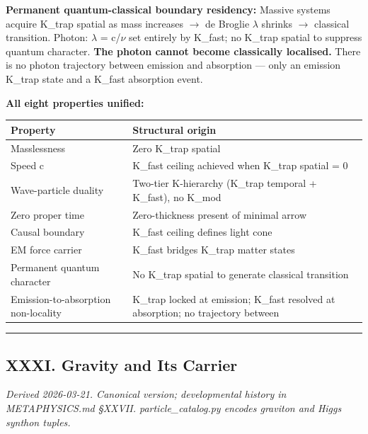 \documentclass[12pt,a4paper]{article}
\begin{document}
\textbf{Permanent quantum-classical boundary residency:} Massive systems acquire K\_trap spatial as mass increases $\rightarrow$ de Broglie $\lambda$ shrinks $\rightarrow$ classical transition. Photon: $\lambda$ = c/$\nu$ set entirely by K\_fast; no K\_trap spatial to suppress quantum character. \textbf{The photon cannot become classically localised.} There is no photon trajectory between emission and absorption --- only an emission K\_trap state and a K\_fast absorption event.

\textbf{All eight properties unified:}

\begin{table}[htbp]
\centering
\small
{}
\begin{tabularx}{\textwidth}{>{\centering\arraybackslash}X >{\centering\arraybackslash}X}
\toprule
\rowcolor{gray!25}\textbf{Property} & \textbf{Structural origin} \\
\midrule
\rowcolors{1}{white}{gray!10}
Masslessness & Zero K\_trap spatial \\
Speed c & K\_fast ceiling achieved when K\_trap spatial = 0 \\
Wave-particle duality & Two-tier K-hierarchy (K\_trap temporal + K\_fast), no K\_mod \\
Zero proper time & Zero-thickness present of minimal arrow \\
Causal boundary & K\_fast ceiling defines light cone \\
EM force carrier & K\_fast bridges K\_trap matter states \\
Permanent quantum character & No K\_trap spatial to generate classical transition \\
Emission-to-absorption non-locality & K\_trap locked at emission; K\_fast resolved at absorption; no trajectory between \\
\bottomrule
\end{tabularx}
\end{table}

\begin{center}
\rule{0.5\textwidth}{0.4pt}
\end{center}

\subsection{XXXI. Gravity and Its Carrier}

\emph{Derived 2026-03-21. Canonical version; developmental history in METAPHYSICS.md §XXVII. particle\_catalog.py encodes graviton and Higgs synthon tuples.}
\end{document}
